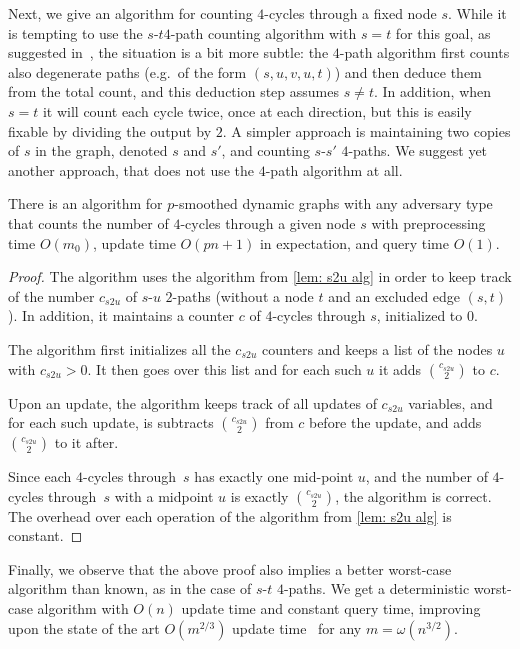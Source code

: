 \documentclass[letter,11pt]{article}
\newcommand{\st}{$s$-$t$\xspace}
\newcommand{\paths}[3]{${#1}$-${#2}$ ${#3}$-paths\xspace}
\begin{document}
Next, we give an algorithm for counting $4$-cycles through a fixed node $s$.
While it is tempting to use the \st $4$-path counting algorithm with $s=t$ for this goal, as suggested in~\cite{HLS22},
the situation is a bit more subtle:
the $4$-path algorithm first counts also degenerate paths (e.g.\ of the form $(s,u,v,u,t)$) 
and then deduce them from the total count, and this deduction step assumes $s\neq t$.
In addition, when $s=t$ it will count each cycle twice, once at each direction, but this is easily fixable by dividing the output by $2$.
A simpler approach is maintaining two copies of $s$ in the graph, denoted $s$ and $s'$, and counting $s$-$s'$ $4$-paths.
We suggest yet another approach, that does not use the $4$-path algorithm at all.

\begin{lemma}
\label{lem:counting s 4cycles}
	There is an algorithm for $p$-smoothed dynamic graphs 
	with any adversary type
	that counts the number of $4$-cycles through a given node $s$ with preprocessing time $O(m_0)$, 
	update time $O(pn+1)$ in expectation, 
	and query time $O(1)$.
\end{lemma}

\begin{proof}
	The algorithm uses the algorithm from \cref{lem: s2u alg} in order to keep track of the number $c_{s2u}$ of $s$-$u$ $2$-paths (without a node $t$ and an excluded edge $(s,t)$).
	In addition, it maintains a counter $c$ of $4$-cycles through $s$, initialized to $0$.
	
	The algorithm first initializes all the $c_{s2u}$ counters and keeps a list of the nodes $u$ with $c_{s2u}>0$.
	It then goes over this list and for each such $u$ it adds $\binom{c_{s2u}}{2}$ to $c$.
	
	Upon an update, the algorithm keeps track of all updates of $c_{s2u}$ variables, and for each such update, is subtracts $\binom{c_{s2u}}{2}$ from $c$ before the update, and adds $\binom{c_{s2u}}{2}$ to it after.
	
	Since each $4$-cycles through~$s$ has exactly one mid-point $u$, and the number of $4$-cycles through~$s$ with a midpoint $u$ is exactly $\binom{c_{s2u}}{2}$, the algorithm is correct.
	The overhead over each operation of the  algorithm from \cref{lem: s2u alg}
	is constant.
\end{proof}

Finally, we observe that the above proof also implies a better worst-case algorithm than known,
as in the case of \paths st4.
We get a deterministic worst-case algorithm with $O(n)$ update time and constant query time,
improving upon the state of the art $O(m^{2/3})$ update time~\cite{HanauerHH22}
for any $m=\omega (n^{3/2})$.
\end{document}
